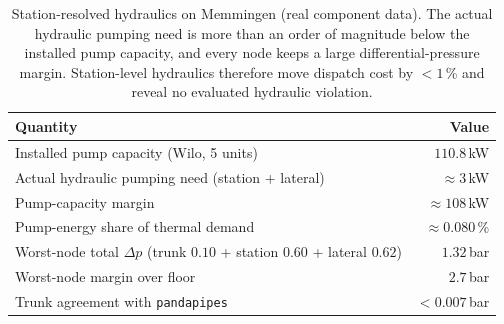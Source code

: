 \begin{table}[t]
\centering
\caption{Station-resolved hydraulics on Memmingen (real component data). The actual hydraulic
pumping need is more than an order of magnitude below the installed pump capacity, and every node keeps a
large differential-pressure margin. Station-level hydraulics therefore move dispatch cost by
$<1$\,\% and reveal no evaluated hydraulic violation.}
\label{tab:hydraulics}
\begin{tabular}{lr}
\hline
Quantity & Value \\
\hline
Installed pump capacity (Wilo, 5 units) & $110.8$\,kW \\
Actual hydraulic pumping need (station + lateral) & $\approx 3$\,kW \\
Pump-capacity margin & $\approx 108$\,kW \\
Pump-energy share of thermal demand & $\approx 0.080$\,\% \\
Worst-node total $\Delta p$ (trunk $0.10$ + station $0.60$ + lateral $0.62$) & $1.32$\,bar \\
Worst-node margin over floor & $2.7$\,bar \\
Trunk agreement with \texttt{pandapipes} & $<0.007$\,bar \\
\hline
\end{tabular}
\end{table}
